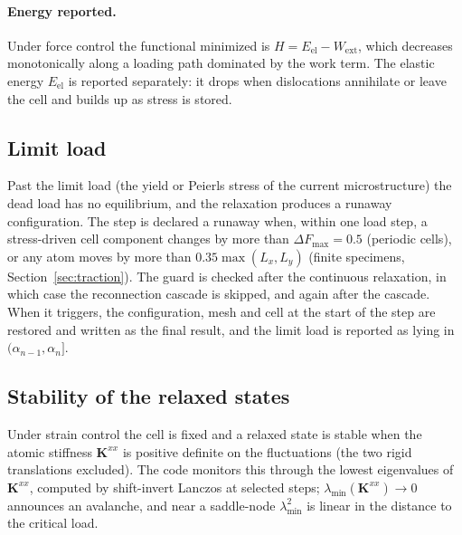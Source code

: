 \documentclass[11pt,a4paper]{article}
\begin{document}
\paragraph{Energy reported.}
Under force control the functional minimized is \(H=E_{\mathrm{el}}-W_{\mathrm{ext}}\), which
decreases monotonically along a loading path dominated by the work term. The elastic energy
\(E_{\mathrm{el}}\) is reported separately: it drops when dislocations annihilate or leave the
cell and builds up as stress is stored.

\subsection{Limit load}
\label{sec:limit}

Past the limit load (the yield or Peierls stress of the current microstructure) the dead load has
no equilibrium, and the relaxation produces a runaway configuration. The step is declared a
runaway when, within one load step, a stress-driven cell component changes by more than
\(\Delta F_{\max}=0.5\) (periodic cells), or any atom moves by more than \(0.35\max(L_x,L_y)\)
(finite specimens, Section~\ref{sec:traction}). The guard is checked after the continuous
relaxation, in which case the reconnection cascade is skipped, and again after the cascade. When it
triggers, the configuration, mesh and cell at the start of the step are restored and written as
the final result, and the limit load is reported as lying in \((\alpha_{n-1},\alpha_n]\).

\subsection{Stability of the relaxed states}
\label{sec:stability}

Under strain control the cell is fixed and a relaxed state is stable when the atomic stiffness
\(\mathbf K^{xx}\) is positive definite on the fluctuations (the two rigid translations excluded).
The code monitors this through the lowest eigenvalues of \(\mathbf K^{xx}\), computed by
shift-invert Lanczos at selected steps; \(\lambda_{\min}(\mathbf K^{xx})\to0\) announces an
avalanche, and near a saddle-node \(\lambda_{\min}^2\) is linear in the distance to the critical
load.
\end{document}
